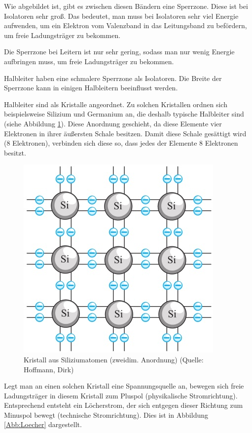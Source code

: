 Wie abgebildet ist, gibt es zwischen diesen Bändern eine Sperrzone.
Diese ist bei Isolatoren sehr groß.
Das bedeutet, man muss bei Isolatoren sehr viel Energie aufwenden, um ein Elektron vom Valenzband in das Leitungsband zu befördern, um freie Ladungsträger zu bekommen.

Die Sperrzone bei Leitern ist nur sehr gering, sodass man nur wenig Energie aufbringen muss, um freie Ladungsträger zu bekommen.

Halbleiter haben eine schmalere Sperrzone als Isolatoren.
Die Breite der Sperrzone kann in einigen Halbleitern beeinflusst werden.

Halbleiter sind als Kristalle angeordnet.
Zu solchen Kristallen ordnen sich beispielsweise Silizium und Germanium an, die deshalb typische Halbleiter sind (siehe Abbildung \ref{Abb:Kristall}).
Diese Anordnung geschieht, da diese Elemente vier Elektronen in ihrer äußersten Schale besitzen.
Damit diese Schale gesättigt wird (8 Elektronen), verbinden sich diese so, dass jedes der Elemente 8 Elektronen besitzt.


\begin{figure}[htp]
\begin{center}
\includegraphics[scale=.8]{pics/Kristall}
\caption{Kristall aus Siliziumatomen (zweidim. Anordnung) (Quelle: Hoffmann, Dirk)}
\label{Abb:Kristall}
\end{center}
\end{figure}


Legt man an einen solchen Kristall eine Spannungsquelle an, bewegen sich freie Ladungsträger in diesem Kristall zum Pluspol (physikalische Stromrichtung).
Entsprechend entsteht ein Löcherstrom, der sich entgegen dieser Richtung zum Minuspol bewegt (technische Stromrichtung).
Dies ist in Abbildung \ref{Abb:Loecher}  dargestellt.

